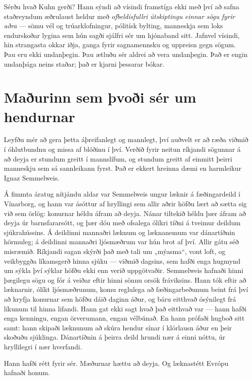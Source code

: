 Sérðu hvað Kuhn gerði? Hann sýndi að vísindi framstíga ekki með því að safna staðreyndum æðrulaust heldur með \emph{ofbeldisfullri útskiptingu einnar sögu fyrir aðra} — sömu vél og trúarklofningur, pólitísk bylting, manneskja sem loks endurskoðar lygina sem hún sagði sjálfri sér um hjónaband sitt. Jafnvel vísindi, hin strangasta okkar iðja, ganga fyrir sagnamennsku og uppreisn gegn sögum. Þau eru ekki undanþegin. Þau ætluðu sér aldrei að vera undanþegin. Það er engin undanþága neins staðar; það er kjarni þessarar bókar.

\section*{Maðurinn sem þvoði sér um hendurnar}

Leyfðu mér að gera þetta áþreifanlegt og mannlegt, því auðvelt er að ræða viðmið í óhlutbundnu og missa af blóðinu í því. Verðið fyrir neitun ríkjandi sögunnar á að deyja er stundum greitt í mannslífum, og stundum greitt af einmitt þeirri manneskju sem sá sannleikann fyrst. Það er ekkert hreinna dæmi en harmleikur Ignaz Semmelweis.

Á fimmta áratug nítjándu aldar var Semmelweis ungur læknir á fæðingardeild í Vínarborg, og hann var ásóttur af hryllingi sem allir aðrir höfðu lært að sætta sig við sem örlög: konurnar héldu áfram að deyja. Nánar tiltekið héldu þær áfram að deyja úr barnsfararsótt, og þær dóu með ofsalega ólíkri tíðni á tveimur deildum sjúkrahússins. Á deildinni mannaðri læknum og læknanemum var dánartíðnin hörmuleg; á deildinni mannaðri ljósmæðrum var hún brot af því. Allir gátu séð misræmið. Ríkjandi sagan skýrði það með tali um „mýasma“, vont loft, og veikbyggða líkamsgerð hinna sjúku — viðmið dagsins, sem hafði enga hugmynd um sýkla því sýklar höfðu ekki enn verið uppgötvaðir. Semmelweis hafnaði hinni þægilegu sögu og fór á veiðar eftir hinni sönnu orsök fráviksins. Hann tók eftir að læknarnir, ólíkt ljósmæðrunum, komu reglulega að fæðingarbeðunum beint frá því að kryfja konurnar sem höfðu dáið daginn áður, og báru eitthvað ósýnilegt frá líkunum til hinna lifandi. Hann gat ekki sagt hvað það eitthvað var — hann hafði enga kenningu, engan örverumann, engan vélbúnað. En hann prófaði hugboð sitt samt: hann skipaði læknunum að skúra hendur sínar í klórlausn áður en þeir skoðuðu sjúklinga. Dánartíðnin á þeirra deild hrundi nær á einni nóttu, úr hryllilegri í nær hverfandi.

Hann hafði rétt fyrir sér. Mæðurnar hættu að deyja. Og læknastétt Evrópu hafnaði honum.

